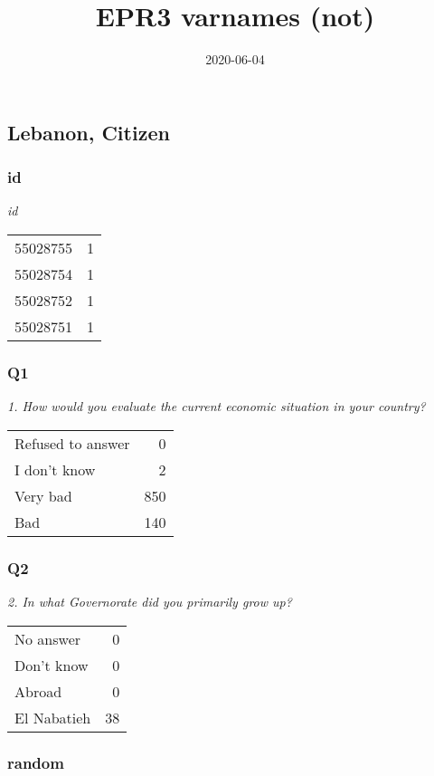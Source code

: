 \documentclass[
]{article}
\title{EPR3 varnames (not)}
\author{2020-06-04}
\date{}
\begin{document}
\maketitle

{
\hypersetup{linkcolor=}
\setcounter{tocdepth}{2}
\tableofcontents
}
\hypertarget{lebanon-citizen}{%
\subsection{Lebanon, Citizen}\label{lebanon-citizen}}

\hypertarget{id}{%
\subsubsection{id}\label{id}}

\textit{id}

\begin{longtable}[]{@{}lr@{}}
\toprule
\endhead
55028755 & 1\tabularnewline
55028754 & 1\tabularnewline
55028752 & 1\tabularnewline
55028751 & 1\tabularnewline
\bottomrule
\end{longtable}

\hypertarget{q1}{%
\subsubsection{Q1}\label{q1}}

\textit{1. How would you evaluate the current economic situation in your country? }

\begin{longtable}[]{@{}lr@{}}
\toprule
\endhead
Refused to answer & 0\tabularnewline
I don't know & 2\tabularnewline
Very bad & 850\tabularnewline
Bad & 140\tabularnewline
\bottomrule
\end{longtable}

\hypertarget{q2}{%
\subsubsection{Q2}\label{q2}}

\textit{2. In what Governorate did you primarily grow up?}

\begin{longtable}[]{@{}lr@{}}
\toprule
\endhead
No answer & 0\tabularnewline
Don't know & 0\tabularnewline
Abroad & 0\tabularnewline
El Nabatieh & 38\tabularnewline
\bottomrule
\end{longtable}

\hypertarget{random}{%
\subsubsection{random}\label{random}}
\end{document}
